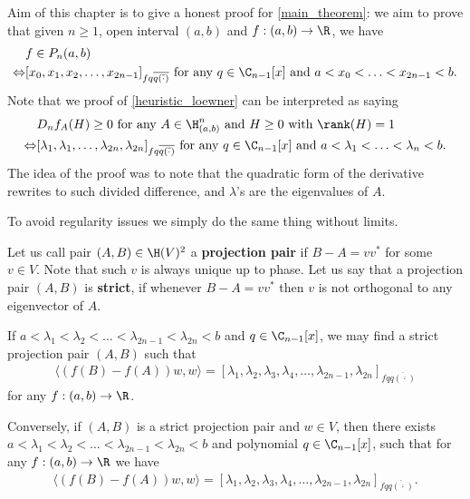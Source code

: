 Aim of this chapter is to give a honest proof for \ref{main_theorem}: we aim to prove that given $n \geq 1$, open interval $(a, b)$ and $f : (a, b) \to \R$, we have 
\begin{align*}
	& f \in P_{n}(a, b) \\
	\Leftrightarrow &[x_{0}, x_{1}, x_{2}, \ldots, x_{2 n - 1}]_{f q \overline{q(\overline{\cdot})}} \text{ for any $q \in \C_{n - 1}[x]$ and $a < x_{0} < \ldots < x_{2 n - 1} < b$}.
\end{align*}
Note that we proof of \ref{heuristic_loewner} can be interpreted as saying
\begin{align*}
	& D_{n} f_{A}(H) \geq 0 \text{ for any $A \in \H^{n}_{(a, b)}$ and $H \geq 0$ with $\rank(H) = 1$} \\
	\Leftrightarrow &[\lambda_{1}, \lambda_{1}, \ldots, \lambda_{2 n}, \lambda_{2 n}]_{f q \overline{q(\overline{\cdot})}} \text{ for any $q \in \C_{n - 1}[x]$ and $a < \lambda_{1} < \ldots < \lambda_{n} < b$}.
\end{align*}
The idea of the proof was to note that the quadratic form of the derivative rewrites to such divided difference, and $\lambda$'s are the eigenvalues of $A$.

To avoid regularity issues we simply do the same thing without limits.

\begin{maar}
	Let us call pair $(A, B) \in \H(V)^{2}$ a \textbf{projection pair} if $B - A = v v^{*}$ for some $v \in V$. Note that such $v$ is always unique up to phase. Let us say that a projection pair $(A, B)$ is \textbf{strict}, if whenever $B - A = v v^{*}$ then $v$ is not orthogonal to any eigenvector of $A$. 
\end{maar}

\begin{lem}\label{main_lemma}
	If $a < \lambda_{1} < \lambda_{2} < \ldots < \lambda_{2 n - 1} < \lambda_{2 n} < b$ and $q \in \C_{n - 1}[x]$, we may find a strict projection pair $(A, B)$ such that
	\begin{align*}
		\langle (f(B) - f(A)) w, w \rangle = [\lambda_{1}, \lambda_{2}, \lambda_{3}, \lambda_{4}, \ldots, \lambda_{2n - 1}, \lambda_{2 n}]_{f q \overline{q(\overline{\cdot})}}
	\end{align*}
	for any $f : (a, b) \to \R$.

	Conversely, if $(A, B)$ is a strict projection pair and $w \in V$, then there exists $a < \lambda_{1} < \lambda_{2} < \ldots < \lambda_{2 n - 1} < \lambda_{2 n} < b$ and polynomial $q \in \C_{n - 1}[x]$, such that for any $f : (a, b) \to \R$ we have
	\begin{align*}
		\langle (f(B) - f(A)) w, w \rangle = [\lambda_{1}, \lambda_{2}, \lambda_{3}, \lambda_{4}, \ldots, \lambda_{2n - 1}, \lambda_{2 n}]_{f q \overline{q(\overline{\cdot})}}.
	\end{align*}
\end{lem}


